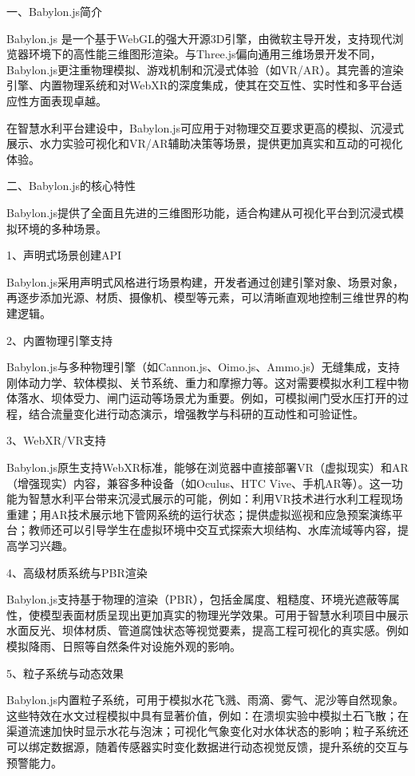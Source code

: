 一、Babylon.js简介

Babylon.js 是一个基于WebGL的强大开源3D引擎，由微软主导开发，支持现代浏览器环境下的高性能三维图形渲染。与Three.js偏向通用三维场景开发不同，Babylon.js更注重物理模拟、游戏机制和沉浸式体验（如VR/AR）。其完善的渲染引擎、内置物理系统和对WebXR的深度集成，使其在交互性、实时性和多平台适应性方面表现卓越。

在智慧水利平台建设中，Babylon.js可应用于对物理交互要求更高的模拟、沉浸式展示、水力实验可视化和VR/AR辅助决策等场景，提供更加真实和互动的可视化体验。

二、Babylon.js的核心特性

Babylon.js提供了全面且先进的三维图形功能，适合构建从可视化平台到沉浸式模拟环境的多种场景。

1、声明式场景创建API

Babylon.js采用声明式风格进行场景构建，开发者通过创建引擎对象、场景对象，再逐步添加光源、材质、摄像机、模型等元素，可以清晰直观地控制三维世界的构建逻辑。

2、内置物理引擎支持

Babylon.js与多种物理引擎（如Cannon.js、Oimo.js、Ammo.js）无缝集成，支持刚体动力学、软体模拟、关节系统、重力和摩擦力等。这对需要模拟水利工程中物体落水、坝体受力、闸门运动等场景尤为重要。例如，可模拟闸门受水压打开的过程，结合流量变化进行动态演示，增强教学与科研的互动性和可验证性。

3、WebXR/VR支持

Babylon.js原生支持WebXR标准，能够在浏览器中直接部署VR（虚拟现实）和AR（增强现实）内容，兼容多种设备（如Oculus、HTC Vive、手机AR等）。这一功能为智慧水利平台带来沉浸式展示的可能，例如：利用VR技术进行水利工程现场重建；用AR技术展示地下管网系统的运行状态；提供虚拟巡视和应急预案演练平台；教师还可以引导学生在虚拟环境中交互式探索大坝结构、水库流域等内容，提高学习兴趣。

4、高级材质系统与PBR渲染

Babylon.js支持基于物理的渲染（PBR），包括金属度、粗糙度、环境光遮蔽等属性，使模型表面材质呈现出更加真实的物理光学效果。可用于智慧水利项目中展示水面反光、坝体材质、管道腐蚀状态等视觉要素，提高工程可视化的真实感。例如模拟降雨、日照等自然条件对设施外观的影响。

5、粒子系统与动态效果

Babylon.js内置粒子系统，可用于模拟水花飞溅、雨滴、雾气、泥沙等自然现象。这些特效在水文过程模拟中具有显著价值，例如：在溃坝实验中模拟土石飞散；在渠道流速加快时显示水花与泡沫；可视化气象变化对水体状态的影响；粒子系统还可以绑定数据源，随着传感器实时变化数据进行动态视觉反馈，提升系统的交互与预警能力。

